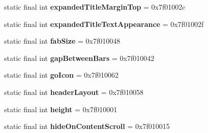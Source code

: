\begin{DoxyCompactItemize}
\item 
\hypertarget{classandroid_1_1support_1_1design_1_1_r_1_1attr_ab480074094d112513cccb460ca7d08ce}{}static final int {\bfseries expanded\+Title\+Margin\+Top} = 0x7f01002c\label{classandroid_1_1support_1_1design_1_1_r_1_1attr_ab480074094d112513cccb460ca7d08ce}

\item 
\hypertarget{classandroid_1_1support_1_1design_1_1_r_1_1attr_a0093d7cf21b5718aa96f111e023ca986}{}static final int {\bfseries expanded\+Title\+Text\+Appearance} = 0x7f01002f\label{classandroid_1_1support_1_1design_1_1_r_1_1attr_a0093d7cf21b5718aa96f111e023ca986}

\item 
\hypertarget{classandroid_1_1support_1_1design_1_1_r_1_1attr_ae50af000a6d2566abf822dd923f0e6bc}{}static final int {\bfseries fab\+Size} = 0x7f010048\label{classandroid_1_1support_1_1design_1_1_r_1_1attr_ae50af000a6d2566abf822dd923f0e6bc}

\item 
\hypertarget{classandroid_1_1support_1_1design_1_1_r_1_1attr_af5aa83bca46ec78627ca7af277ace09a}{}static final int {\bfseries gap\+Between\+Bars} = 0x7f010042\label{classandroid_1_1support_1_1design_1_1_r_1_1attr_af5aa83bca46ec78627ca7af277ace09a}

\item 
\hypertarget{classandroid_1_1support_1_1design_1_1_r_1_1attr_ab0832bfcb7a264b7f160a92f19c26514}{}static final int {\bfseries go\+Icon} = 0x7f010062\label{classandroid_1_1support_1_1design_1_1_r_1_1attr_ab0832bfcb7a264b7f160a92f19c26514}

\item 
\hypertarget{classandroid_1_1support_1_1design_1_1_r_1_1attr_a669a14ce772e913e335a7e450b199e21}{}static final int {\bfseries header\+Layout} = 0x7f010058\label{classandroid_1_1support_1_1design_1_1_r_1_1attr_a669a14ce772e913e335a7e450b199e21}

\item 
\hypertarget{classandroid_1_1support_1_1design_1_1_r_1_1attr_a67de67e33346463b7e8ccac5a5c3d2b8}{}static final int {\bfseries height} = 0x7f010001\label{classandroid_1_1support_1_1design_1_1_r_1_1attr_a67de67e33346463b7e8ccac5a5c3d2b8}

\item 
\hypertarget{classandroid_1_1support_1_1design_1_1_r_1_1attr_afad42994576791dcb844b6d5a92b106e}{}static final int {\bfseries hide\+On\+Content\+Scroll} = 0x7f010015\label{classandroid_1_1support_1_1design_1_1_r_1_1attr_afad42994576791dcb844b6d5a92b106e}


\end{DoxyCompactItemize}
